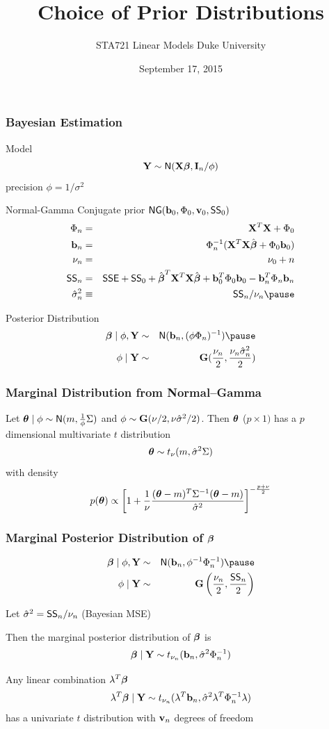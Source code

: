 \documentclass[handout]{beamer}
\title{Choice of Prior Distributions}
\institute{Merlise Clyde}
\author{STA721 Linear Models Duke University}
\date{September 17, 2015}
\begin{document}
\maketitle

\begin{frame}
  \frametitle{Bayesian Estimation}
  Model 
$$
\mathbf{Y} \sim \textsf{N}(\mathbf{X} \boldsymbol{\beta}, \mathbf{I}_n/\phi)
$$
precision  $\phi = 1/\sigma^2$ 
\pause

\vspace{14pt}
Normal-Gamma Conjugate prior  $\textsf{NG}(\mathbf{b}_0, \Phi_0, \mathbf{v}_0, \textsf{SS}_0)$
  \begin{eqnarray*}
\Phi_n & = & \X^T\X +  \Phi_0  \\
\bv_n &  = & \Phi_n^{-1} (\X^T\X \bhat  + \Phi_0 \bv_0)  \\
\nu_n  & = & \nu_0 + n   \\
\SS_n & = & \SSE + \SS_0 + \bhat^T \X^T\X \bhat + \bv_0^T \Phi_0 \bv_0
 - \bv_n^T \Phi_n \bv_n   \\
\hat{\sigma}^2_n & \equiv & \SS_n/\nu_n \pause
  \end{eqnarray*}

Posterior Distribution
  \begin{eqnarray*}
\b \mid \phi, \Y & \sim &\N(\bv_n, (\phi \Phi_n)^{-1}) \pause \\
\phi \mid \Y &\sim &\G(\frac{\nu_n}{2}, \frac{  \nu_n \hat{\sigma}^2_n}{2})
  \end{eqnarray*}
  

\end{frame}


\begin{frame}
  \frametitle{Marginal Distribution from Normal--Gamma }
  \begin{theorem}
    Let  $\boldsymbol{\theta} \mid \phi \sim \textsf{N}(m, \frac{1}{\phi} \Sigma)$ and $\phi \sim
    \mathbf{G}(\nu/2, \nu {\hat{\sigma}}^2/2)$. Then  $\boldsymbol{\theta}$ ($p \times 1)$ has a $p$
    dimensional multivariate $t$ distribution $$\boldsymbol{\theta} \sim t_\nu( m,
    {\hat{\sigma}}^2 \Sigma )$$ with density
$$p(\boldsymbol{\theta}) \propto  \left[ 1 + \frac{1}{\nu}  \frac{ (\boldsymbol{\theta} - m)^T
    \Sigma^{-1} (\boldsymbol{\theta} - m)}{{\hat{\sigma}}^2} \right]^{- \frac{p + \nu}{2}}$$
  \end{theorem}
\end{frame}


\begin{frame}
  \frametitle{Marginal Posterior Distribution of $\boldsymbol{\beta}$}
  \begin{eqnarray*}
\b \mid \phi, \Y  & \sim & \N( \bv_n, \phi^{-1} \Phi_n^{-1}) \pause \\    
 \phi \mid \Y & \sim & \G\left(\frac{\nu_n}{2},  \frac{\SS_n}{ 2} \right) 
  \end{eqnarray*}
\pause

Let ${\hat{\sigma}}^2 = \textsf{SS}_n/\nu_n$  (Bayesian MSE) \pause

Then the marginal posterior distribution of $\boldsymbol{\beta}$ is 
$$
\boldsymbol{\beta}  \mid \mathbf{Y} \sim t_{\nu_n} (\mathbf{b}_n, {\hat{\sigma}}^2 \Phi_n^{-1})
$$ \pause


Any linear combination $\lambda^T\boldsymbol{\beta}$
$$\lambda^T\boldsymbol{\beta}  \mid \mathbf{Y} \sim t_{\nu_n}
(\lambda^T\mathbf{b}_n, {\hat{\sigma}}^2 \lambda^T\Phi_n^{-1}\lambda)$$ has a univariate
$t$ distribution with $\mathbf{v}_n$ degrees of freedom

\end{frame}
\end{document}
